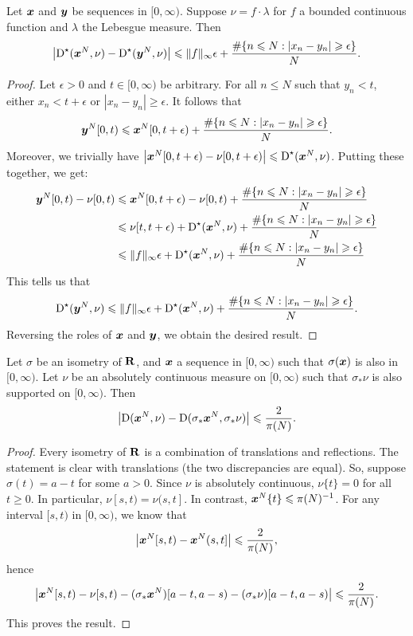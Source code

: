 \begin{lemma}\label{lem:disc-of-two-seq}
Let ${\boldsymbol x}$ and ${\boldsymbol y}$ be sequences in $[0,\infty)$. Suppose 
$\nu = f\cdot \lambda$ for $f$ a bounded continuous function and $\lambda$ the 
Lebesgue measure. Then 
\[
	\left|\operatorname{D}^\star({\boldsymbol x}^N, \nu) - \operatorname{D}^\star({\boldsymbol y}^N,\nu)\right| \leqslant \|f\|_\infty \epsilon + \frac{\#\{ n\leqslant N : |x_n - y_n| \geqslant \epsilon\}}{N} .
\]
\end{lemma}
\begin{proof}
Let $\epsilon>0$ and $t\in [0,\infty)$ be arbitrary. For all $n\leqslant N$ 
such that $y_n<t$, either $x_n < t+\epsilon$ or 
$|x_n - y_n| \geqslant \epsilon$. It follows that 
\[
	{\boldsymbol y}^N[0,t) \leqslant {\boldsymbol x}^N[0,t+\epsilon) + \frac{\#\{ n\leqslant N : |x_n - y_n| \geqslant \epsilon\}}{N} .
\]
Moreover, we trivially have 
$\left| {\boldsymbol x}^N[0,t+\epsilon) - \nu[0,t+\epsilon)\right| \leqslant \operatorname{D}^\star({\boldsymbol x}^N,\nu)$. Putting these together, we get: 
\begin{align*}
	{\boldsymbol y}^N[0,t) - \nu[0,t) 
		&\leqslant {\boldsymbol x}^N[0,t+\epsilon) - \nu[0,t) + \frac{\#\{ n\leqslant N : |x_n - y_n| \geqslant \epsilon\}}{N} \\
		&\leqslant \nu[t,t+\epsilon) + \operatorname{D}^\star({\boldsymbol x}^N,\nu) + \frac{\#\{ n\leqslant N : |x_n - y_n| \geqslant \epsilon\}}{N} \\
		&\leqslant \|f\|_\infty \epsilon + \operatorname{D}^\star({\boldsymbol x}^N,\nu) + \frac{\#\{ n\leqslant N : |x_n - y_n| \geqslant \epsilon\}}{N} 
\end{align*}
This tells us that 
\[
	\operatorname{D}^\star({\boldsymbol y}^N,\nu) \leqslant \|f\|_\infty \epsilon + \operatorname{D}^\star({\boldsymbol x}^N,\nu) + \frac{\#\{ n\leqslant N : |x_n - y_n| \geqslant \epsilon\}}{N} .
\]
Reversing the roles of ${\boldsymbol x}$ and ${\boldsymbol y}$, we obtain the desired result. 
\end{proof}

\begin{lemma}
Let $\sigma$ be an isometry of $\mathbf{R}$, and ${\boldsymbol x}$ a sequence in $[0,\infty)$ 
such that $\sigma({\boldsymbol x})$ is also in $[0,\infty)$. Let $\nu$ be an absolutely 
continuous measure on $[0,\infty)$ such that $\sigma_\ast \nu$ is also 
supported on $[0,\infty)$. Then 
\[
	\left|\operatorname{D}({\boldsymbol x}^N, \nu) - \operatorname{D}(\sigma_\ast {\boldsymbol x}^N, \sigma_\ast \nu)\right| \leqslant \frac{2}{\pi(N)} .
\]
\end{lemma}
\begin{proof}
Every isometry of $\mathbf{R}$ is a combination of translations and reflections. 
The statement is clear with translations (the two discrepancies are equal). So, 
suppose $\sigma(t) = a - t$ for some $a>0$. Since $\nu$ is absolutely 
continuous, $\nu\{t\}=0$ for all $t\geqslant 0$. In particular, 
$\nu[s,t) = \nu(s,t]$. In contrast, ${\boldsymbol x}^N\{t\}\leqslant \pi(N)^{-1}$. For any 
interval $[s,t)$ in $[0,\infty)$, we know that 
\[
	\left| {\boldsymbol x}^N[s,t) - {\boldsymbol x}^N(s,t]\right| \leqslant \frac{2}{\pi(N)}  ,
\]
hence 
\[
	\left| {\boldsymbol x}^N[s,t) - \nu[s,t) - (\sigma_\ast {\boldsymbol x}^N)[a-t,a-s) - (\sigma_\ast \nu)[a-t,a-s)\right| \leqslant \frac{2}{\pi(N)} .
\]
This proves the result. 
\end{proof}

